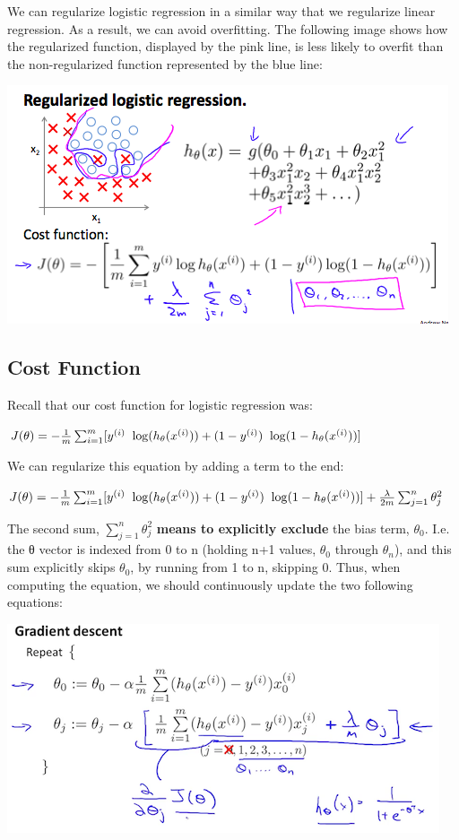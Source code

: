 \documentclass[
]{book}
\begin{document}
We can regularize logistic regression in a similar way that we regularize linear regression. As a result, we can avoid overfitting. The following image shows how the regularized function, displayed by the pink line, is less likely to overfit than the non-regularized function represented by the blue line:

\includegraphics{RegLogReg.png}

\hypertarget{cost-function}{%
\subsection{Cost Function}\label{cost-function}}

Recall that our cost function for logistic regression was:

\(J(\theta) = - \frac{1}{m} \sum_{i=1}^m \large[ y^{(i)}\ \log (h_\theta (x^{(i)})) + (1 - y^{(i)})\ \log (1 - h_\theta(x^{(i)})) \large]\)

We can regularize this equation by adding a term to the end:

\(J(\theta) = - \frac{1}{m} \sum_{i=1}^m \large[ y^{(i)}\ \log (h_\theta (x^{(i)})) + (1 - y^{(i)})\ \log (1 - h_\theta(x^{(i)}))\large] + \frac{\lambda}{2m}\sum_{j=1}^n \theta_j^2\)

The second sum, \(\sum_{j=1}^n \theta_j^2\) \textbf{means to explicitly exclude} the bias term, \(\theta_0\). I.e. the θ vector is indexed from 0 to n (holding n+1 values, \(\theta_0\) through \(\theta_n\)), and this sum explicitly skips \(\theta_0\), by running from 1 to n, skipping 0. Thus, when computing the equation, we should continuously update the two following equations:

\includegraphics{RegLogReg2.png}
\end{document}
